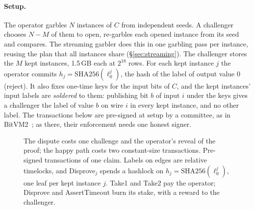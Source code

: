 \documentclass[11pt]{article}
\begin{document}
\paragraph{Setup.} The operator garbles $N$ instances of $C$ from independent
seeds. A challenger chooses $N-M$ of them to open, re-garbles each opened
instance from its seed and compares. The streaming garbler does this in one
garbling pass per instance, reusing the plan that all instances share
(\S\ref{sec:streaming}). The challenger stores the $M$ kept instances, 1.5\,GB
each at $2^{18}$ rows. For each kept instance $j$ the operator commits
$h_j=\mathrm{SHA256}(\ell^j_0)$, the hash of the label of output value 0
(reject). It also fixes
one-time keys for the input bits of $C$, and the kept instances' input labels
are \emph{soldered} to them: publishing bit $b$ of input $i$ under the keys gives
a challenger the label of value $b$ on wire $i$ in every kept instance, and no
other label. The transactions below are pre-signed at setup by a committee, as in
BitVM2~\cite{laa25bitvm2}; as there, their enforcement needs one honest signer.

\begin{figure}[t]\centering
{}
\caption{The dispute costs one challenge and the operator's reveal of the proof;
the happy path costs two constant-size transactions. Pre-signed transactions of one
claim. Labels on edges are relative timelocks, and Disprove$_j$ spends a hashlock
on $h_j=\mathrm{SHA256}(\ell^j_0)$, one leaf per kept instance $j$. Take1 and Take2 pay the operator;
Disprove and AssertTimeout burn its stake, with a reward to the challenger.}
\label{fig:graph}
\end{figure}
\end{document}
